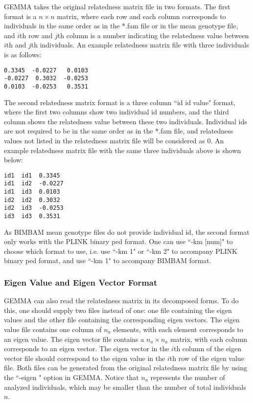 \documentclass[11pt]{article}
\begin{document}
GEMMA takes the original relatedness matrix file in two formats. The
first format is a $n\times n$ matrix, where each row and each column
corresponds to individuals in the same order as in the *.fam file or
in the mean genotype file, and $i$th row and $j$th column is a number
indicating the relatedness value between $i$th and $j$th
individuals. An example relatedness matrix file with three individuals
is as follows:
%
\begin{verbatim}
0.3345  -0.0227   0.0103
-0.0227  0.3032  -0.0253
0.0103  -0.0253   0.3531
\end{verbatim}
%
The second relatedness matrix format is a three column ``id id value"
format, where the first two columns show two individual id numbers,
and the third column shows the relatedness value between these two
individuals. Individual ids are not required to be in the same order
as in the *.fam file, and relatedness values not listed in the
relatedness matrix file will be considered as 0. An example
relatedness matrix file with the same three individuals above is shown
below:
%
\begin{verbatim}
id1  id1  0.3345
id1  id2  -0.0227
id1  id3  0.0103
id2  id2  0.3032
id2  id3  -0.0253
id3  id3  0.3531
\end{verbatim}
%
As BIMBAM mean genotype files do not provide individual id, the second
format only works with the PLINK binary ped format. One can use ``-km
[num]" to choose which format to use, i.e. use ``-km 1" or ``-km 2" to
accompany PLINK binary ped format, and use ``-km 1" to accompany
BIMBAM format.

\subsubsection{Eigen Value and Eigen Vector Format}

GEMMA can also read the relatedness matrix in its decomposed forms. To
do this, one should supply two files instead of one: one file
containing the eigen values and the other file containing the
corresponding eigen vectors. The eigen value file contains one column
of $n_{a}$ elements, with each element corresponds to an eigen
value. The eigen vector file contains a $n_a\times n_a$ matrix, with
each column corresponds to an eigen vector. The eigen vector in the
$i$th column of the eigen vector file should correspond to the eigen
value in the $i$th row of the eigen value file. Both files can be
generated from the original relatedness matrix file by using the
``-eigen " option in GEMMA. Notice that $n_a$ represents the number of
analyzed individuals, which may be smaller than the number of total
individuals $n$.
\end{document}
